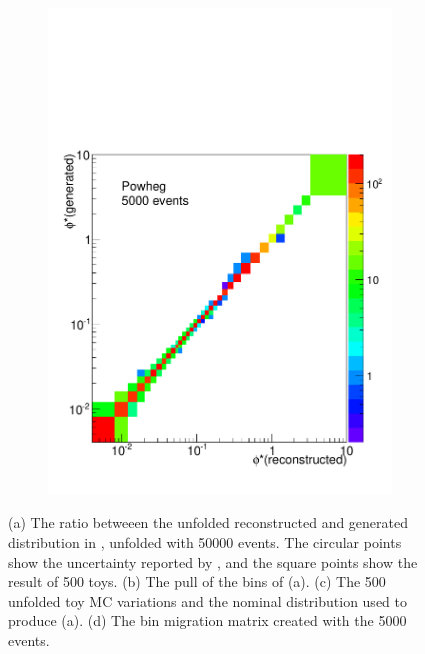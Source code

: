 \begin{figure}[!htbp]
\begin{subfigure}[b]{\SideBySidePlotWidth}
        \includegraphics[width=\textwidth]{figures/BinM_P_5000.pdf}
        \caption{}
        \label{fig:bin_migration_5000}
    \end{subfigure}
    \caption[
        Full uncertainty propegation using \num{5000} \POWHEG events to unfold
        \MADGRAPH.
    ]{
        (a) The ratio betweeen the unfolded reconstructed and generated
        \phistar distribution in \MADGRAPH, unfolded with \num{50000} \POWHEG
        events. The circular points show the uncertainty reported by
        \RooUnfold, and the square points show the result of \num{500} toys.
        (b) The pull of the bins of (a). (c) The \num{500} unfolded toy MC
        variations and the nominal distribution used to produce (a). (d) The
        bin migration matrix created with the \num{5000} \POWHEG events.
    }
\label{fig:5000_propegation_unfolding}
\end{figure}

